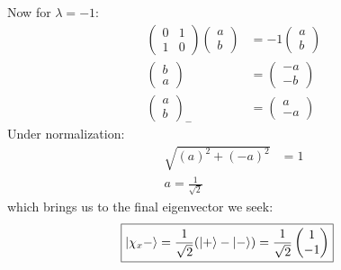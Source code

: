 \documentclass{jhwhw}
\begin{document}
Now for $\lambda = -1$:
\begin{align}
	\begin{pmatrix}
		0	&	1	\\
		1	&	0
	\end{pmatrix}
	\begin{pmatrix}
		a	\\
		b
	\end{pmatrix}
	&=
	-1
	\begin{pmatrix}
		a	\\
		b
	\end{pmatrix}
	\\
	\begin{pmatrix}
		b	\\
		a
	\end{pmatrix}
	&=
	\begin{pmatrix}
		-a	\\
		-b
	\end{pmatrix}
	\\
	\begin{pmatrix}
		a	\\
		b
	\end{pmatrix}_-
	&=
	\begin{pmatrix}
		a	\\
		-a
	\end{pmatrix}
\end{align}
Under normalization:
\begin{align}
	\sqrt{(a)^2+(-a)^2} &= 1 \\
	a = \frac{1}{\sqrt{2}}
\end{align}
which brings us to the final eigenvector we seek:
\begin{align}
	\Aboxed{
	\ket{\chi_x -} &= 
	\frac{1}{\sqrt{2}}(\ket{+} - \ket{-}) = 
	\frac{1}{\sqrt{2}}
	\begin{pmatrix}
		1 \\
		-1
	\end{pmatrix}
	}
\end{align}
\pagebreak[4]
\end{document}
